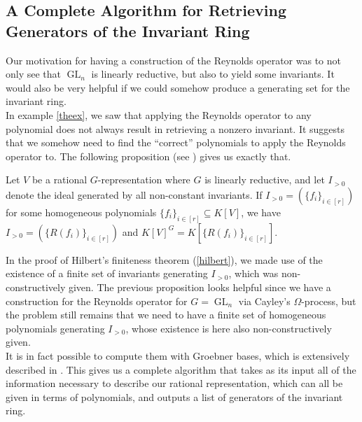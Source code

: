 \subsection{A Complete Algorithm for Retrieving Generators of the Invariant Ring}
Our motivation for having a construction of the Reynolds operator was to not only see that $\operatorname{GL}_n$ is linearly reductive, but also to yield some invariants.
It would also be very helpful if we could somehow produce a generating set for the invariant ring.  \\
In example \ref{theex}, we saw that applying the Reynolds operator to any polynomial does not always result in retrieving a nonzero invariant.
It suggests that we somehow need to find the ``correct'' polynomials to apply the Reynolds operator to.
The following proposition (see \cite[prop. 4.1.1]{DK15}) gives us exactly that.
\begin{proposition}
  Let $V$ be a rational $G$-representation where $G$ is linearly reductive, and let $I_{>0}$ denote the ideal generated by all non-constant invariants.
  If $I_{>0} = \left(\{f_i\}_{i \in[r]}\right)$ for some homogeneous polynomials $\{f_i\}_{i\in[r]} \subseteq K[V]$, we have $I_{>0} = \left(\{R(f_i)\}_{i\in[r]}\right)$ and $K[V]^G = K\left[\{R(f_i)\}_{i\in[r]}\right]$.
\end{proposition}
In the proof of Hilbert's finiteness theorem (\ref{hilbert}), we made use of the existence of a finite set of invariants generating $I_{>0}$, which was non-constructively given.
The previous proposition looks helpful since we have a construction for the Reynolds operator for $G=\operatorname{GL}_n$ via Cayley's $\Omega$-process, but the problem still remains that we need to have a finite set of homogeneous polynomials generating $I_{>0}$, whose existence is here also non-constructively given.  \\
It is in fact possible to compute them with Groebner bases, which is extensively described in \cite[Algorithm 4.1.9]{DK15}.
This gives us a complete algorithm that takes as its input all of the information necessary to describe our rational representation, which can all be given in terms of polynomials, and outputs a list of generators of the invariant ring.

